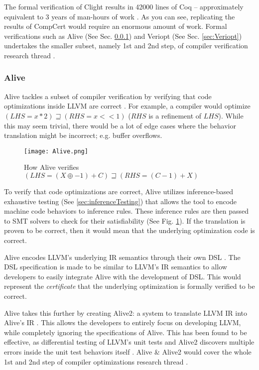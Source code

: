 The formal verification of Clight results in 42000 lines of Coq -- approximately equivalent to 3 years of man-hours 
of work \cite[Sec. 3.3]{compcertVerification}. As you can see, replicating the results of CompCert would require an enormous amount of work.
Formal verifications such as Alive (See Sec. \ref{sec:Alive}) and Veriopt (See Sec. \ref{sec:Veriopt}) undertakes the smaller subset, 
namely 1st and 2nd step, of compiler verification research thread \cite{CompilerOptimization}.

\subsubsection{Alive}
\label{sec:Alive}

Alive tackles a subset of compiler verification by verifying that code optimizations inside LLVM are correct \cite{AliveInLean}. For example, 
a compiler would optimize \((LHS = x * 2) \sqsupseteq (RHS = x << 1)\) (\(RHS\) is a refinement of \(LHS\)). While this may seem trivial, there would 
be a lot of edge cases where the behavior translation might be incorrect; e.g. buffer overflows.

\begin{figure}[ht]
    \centering
    \texttt{[image: Alive.png]}
    \caption{How Alive verifies \((LHS = (X \oplus -1) + C) \sqsupseteq (RHS = (C-1) + X)\) \cite[pp. 1]{AliveInLean}}
    \label{fig:AliveSystem}
\end{figure}

To verify that code optimizations are correct, Alive utilizes inference-based exhaustive testing (See \ref{sec:inferenceTesting}) that allows 
the tool to encode machine code behaviors to inference rules. These inference rules are then passed to SMT solvers to check for their satisfiability 
(See Fig. \ref{fig:AliveSystem}). If the translation is proven to be correct, then it would mean that the underlying optimization code is correct.

Alive encodes LLVM's \cite{llvm} underlying IR semantics through their own DSL \cite[Fig. 1]{AliveInLean}. The DSL specification is made to be 
similar to LLVM's IR semantics to allow developers to easily integrate Alive with the development of DSL. This would represent the 
\emph{certificate} that the underlying optimization is formally verified to be correct.

Alive takes this further by creating Alive2: a system to translate LLVM IR into Alive's IR \cite{Alive2}. This allows the developers to entirely 
focus on developing LLVM, while completely ignoring the specifications of Alive. This has been found to be effective, as differential testing of 
LLVM's unit tests and Alive2 discovers multiple errors inside the unit test behaviors itself \cite[Sec. 8.2]{Alive2}. Alive \& Alive2 would cover 
the whole 1st and 2nd step of compiler optimizations research thread \cite[pp. 5]{CompilerOptimization}.

